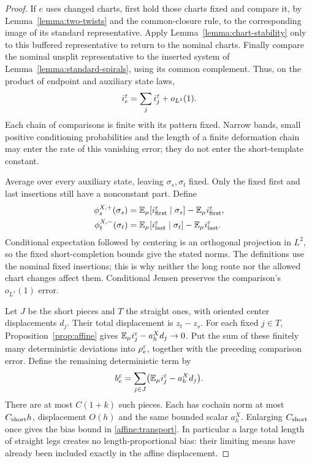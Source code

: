 \begin{proof}
If $e$ uses changed charts, first hold those charts fixed and compare it,
by Lemma~\ref{lemma:two-twists} and the common-closure rule, to the
corresponding image of its standard representative.  Apply
Lemma~\ref{lemma:chart-stability} only to this buffered representative
to return to the nominal charts.  Finally compare the nominal unsplit
representative to the inserted system of
Lemma~\ref{lemma:standard-spirals}, using its common complement.  Thus,
on the product of endpoint and auxiliary state laws,
\[
 i_e^\varepsilon=\sum_j i_j^\varepsilon+o_{L^1}(1).
\]
Each chain of comparisons is finite with its pattern fixed.  Narrow
bands, small positive conditioning probabilities and the length of a
finite deformation chain may enter the rate of this vanishing error;
they do not enter the short-template constant.

Average over every auxiliary state, leaving $\sigma_s,\sigma_t$ fixed.
Only the fixed first and last insertions still have a nonconstant part.
Define
\[
 \begin{split}
 \phi_s^{X,+}(\sigma_s)
   &=\mathbb E_\mu[i_{\rm first}^\varepsilon\mid\sigma_s]
                         -\mathbb E_\mu i_{\rm first}^\varepsilon,\\
 \phi_t^{X,-}(\sigma_t)
   &=\mathbb E_\mu[i_{\rm last}^\varepsilon\mid\sigma_t]
                         -\mathbb E_\mu i_{\rm last}^\varepsilon.
 \end{split}
\]
Conditional expectation followed by centering is an orthogonal
projection in $L^2$, so the fixed short-completion bounds give the stated
norms.  The definitions use the nominal fixed insertions; this is why
neither the long route nor the allowed chart changes affect them.
Conditional Jensen preserves the comparison's $o_{L^1}(1)$ error.

Let $J$ be the short pieces and $T$ the straight ones, with oriented
center displacements $d_j$.  Their total displacement is $z_t-z_s$.
For each fixed $j\in T$, Proposition~\ref{prop:affine} gives
$\mathbb E_\mu i_j^\varepsilon-a_h^X d_j\to0$.  Put the sum of these finitely many
deterministic deviations into $\rho_e^\varepsilon$, together with the preceding
comparison error.  Define the remaining deterministic term by
\[
 b_e^\varepsilon=\sum_{j\in J}
             \bigl(\mathbb E_\mu i_j^\varepsilon-a_h^X d_j\bigr).
\]
There are at most $C(1+k)$ such pieces.  Each has cochain norm at most
$C_{\rm short}h$, displacement $O(h)$ and the same bounded scalar
$a_h^X$.  Enlarging $C_{\rm short}$ once gives the bias bound in
\eqref{affine:transport}.  In particular a large total length of straight
legs creates no length-proportional bias: their limiting means have
already been included exactly in the affine displacement.
\end{proof}

